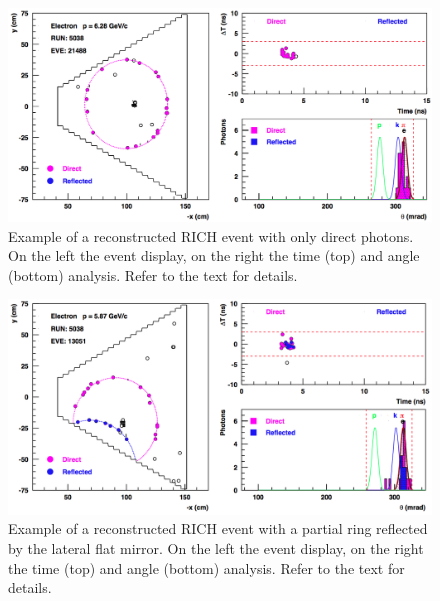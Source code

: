 \documentclass[5p,times,twocolumn]{elsarticle}
\begin{document}
\onecolumn
\begin{figure}[t]
\begin{center}
\includegraphics[width=0.9\columnwidth]{Event_21488.png}
\end{center}
\caption{Example of a reconstructed RICH event with only direct photons. On the left the event display, on the right the time (top) and angle (bottom) analysis. Refer to the text for details.} 
\label{Fig:Event1}
\end{figure}

\begin{figure}[t]
\begin{center}
\includegraphics[width=0.9\columnwidth]{Event_13051.png}
\end{center}
\caption{Example of a reconstructed RICH event with a partial ring reflected by the lateral flat mirror. On the left the event display, on the right the time (top) and angle (bottom) analysis. Refer to the text for details.}
\label{Fig:Event2}
\end{figure}
\end{document}
